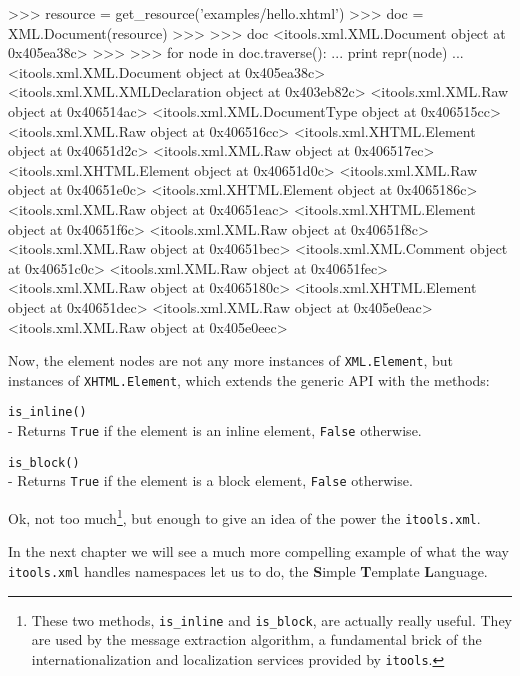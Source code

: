 \begin{code}
    >>> resource = get_resource('examples/hello.xhtml')
    >>> doc = XML.Document(resource)
    >>> 
    >>> doc
    <itools.xml.XML.Document object at 0x405ea38c>
    >>> 
    >>> for node in doc.traverse():
    ...     print repr(node)
    ... 
    <itools.xml.XML.Document object at 0x405ea38c>
    <itools.xml.XML.XMLDeclaration object at 0x403eb82c>
    <itools.xml.XML.Raw object at 0x406514ac>
    <itools.xml.XML.DocumentType object at 0x406515cc>
    <itools.xml.XML.Raw object at 0x406516cc>
    <itools.xml.XHTML.Element object at 0x40651d2c>
    <itools.xml.XML.Raw object at 0x406517ec>
    <itools.xml.XHTML.Element object at 0x40651d0c>
    <itools.xml.XML.Raw object at 0x40651e0c>
    <itools.xml.XHTML.Element object at 0x4065186c>
    <itools.xml.XML.Raw object at 0x40651eac>
    <itools.xml.XHTML.Element object at 0x40651f6c>
    <itools.xml.XML.Raw object at 0x40651f8c>
    <itools.xml.XML.Raw object at 0x40651bec>
    <itools.xml.XML.Comment object at 0x40651c0c>
    <itools.xml.XML.Raw object at 0x40651fec>
    <itools.xml.XML.Raw object at 0x4065180c>
    <itools.xml.XHTML.Element object at 0x40651dec>
    <itools.xml.XML.Raw object at 0x405e0eac>
    <itools.xml.XML.Raw object at 0x405e0eec>
\end{code}

Now, the element nodes are not any more instances of {\tt XML.Element}, but
instances of {\tt XHTML.Element}, which extends the generic API with the
methods:

\begin{api}
    {\tt is\_inline()}\\
    - Returns {\tt True} if the element is an inline element, {\tt False}
    otherwise.

    {\tt is\_block()}\\
    - Returns {\tt True} if the element is a block element, {\tt False}
    otherwise.
\end{api}

Ok, not too much\footnote{These two methods, {\tt is\_inline} and
{\tt is\_block}, are actually really useful. They are used by the message
extraction algorithm, a fundamental brick of the internationalization and
localization services provided by {\tt itools}.}, but enough to give an
idea of the power the {\tt itools.xml}.

In the next chapter we will see a much more compelling example of what the
way {\tt itools.xml} handles namespaces let us to do, the {\bf S}imple
{\bf T}emplate {\bf L}anguage.


